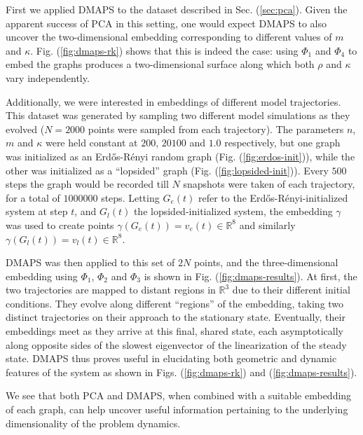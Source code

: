   First we applied DMAPS to the dataset described in
  Sec. (\ref{sec:pca}).
  Given the apparent success of PCA in this setting, one would expect
  DMAPS to also uncover the two-dimensional embedding corresponding to
  different values of $m$ and $\kappa$.
  Fig. (\ref{fig:dmaps-rk}) shows that this is indeed the case: using
  $\Phi_1$ and $\Phi_4$ to embed the graphs produces a two-dimensional
  surface along which both $\rho$ and $\kappa$ vary independently.

  Additionally, we were interested in embeddings of different model
  trajectories.
  This dataset was generated by sampling two different model
  simulations as they evolved ($N=2000$ points were sampled from each
  trajectory).
  The parameters $n$, $m$ and $\kappa$ were held constant at $200$,
  $20100$ and $1.0$ respectively, but one graph was initialized as an
  Erd\H{o}s-R\'{e}nyi random graph (Fig. (\ref{fig:erdos-init})),
  while the other was initialized as a ``lopsided'' graph
  (Fig. (\ref{fig:lopsided-init})).
  Every $500$ steps the graph would be recorded till $N$ snapshots
  were taken of each trajectory, for a total of $1000000$ steps.
  Letting $G_e(t)$ refer to the Erd\H{o}s-R\'{e}nyi-initialized system
  at step $t$, and $G_l(t)$ the lopsided-initialized system, the
  embedding $\gamma$ was used to create points
  $\gamma(G_e(t)) = v_e(t) \in \mathbb{R}^8$ and
  similarly $\gamma(G_l(t)) = v_l(t) \in \mathbb{R}^8$.

  DMAPS was then applied to this set of $2N$ points, and the
  three-dimensional embedding using $\Phi_1$, $\Phi_2$ and $\Phi_3$ is
  shown in Fig. (\ref{fig:dmaps-results}).
  At first, the two trajectories are mapped to distant regions in
  $\mathbb{R}^3$ due to their different initial conditions.
  They evolve along different ``regions'' of the embedding, taking two
  distinct trajectories on their approach to the stationary state.
  Eventually, their embeddings meet as they arrive at this final,
  shared state, each asymptotically along opposite sides of the
  slowest eigenvector of the linearization of the steady state.
  DMAPS thus proves useful in elucidating both geometric and dynamic
  features of the system as shown in Figs. (\ref{fig:dmaps-rk}) and (\ref{fig:dmaps-results}).

  We see that both PCA and DMAPS, when combined with a suitable
  embedding of each graph, can help uncover useful information
  pertaining to the underlying dimensionality of the problem dynamics.


